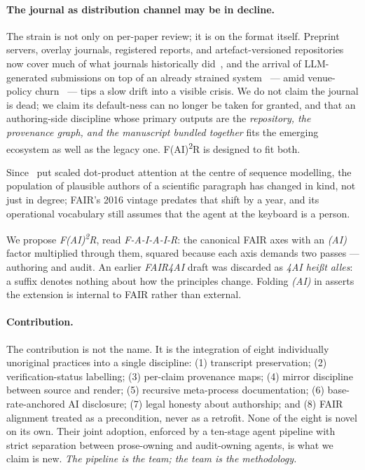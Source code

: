 \paragraph{The journal as distribution channel may be in decline.}
The strain is not only on per-paper review; it is on the format
itself. Preprint servers, overlay journals, registered reports,
and artefact-versioned repositories now cover much of what
journals historically
did~\cite{eisen2018preprints,tennant2016open},
and the arrival of LLM-generated submissions on top of an already
strained system~\cite{conroy2023sleuths} ---
amid venue-policy
churn~\cite{aclrr_llm_policy,iclr_llm_policy,neurips_llm_policy}
--- tips a slow drift into a visible crisis. We do not claim the
journal is dead; we claim its default-ness can no longer be taken
for granted, and that an authoring-side discipline whose primary
outputs are the \emph{repository, the provenance graph, and the
manuscript bundled together} fits the emerging ecosystem as well as
the legacy one. F(AI)\textsuperscript{2}R is designed to fit both.

Since~\textcite{vaswani2017attention} put scaled dot-product attention
at the centre of sequence modelling, the population of plausible
authors of a scientific paragraph has changed in kind, not just in
degree; FAIR's 2016 vintage predates that shift by a year, and its
operational vocabulary still assumes that the agent at the keyboard
is a person.

We propose \emph{F(AI)\textsuperscript{2}R}, read
\emph{F-A-I-A-I-R}: the canonical FAIR axes with an \emph{(AI)}
factor multiplied through them, squared because each axis demands
two passes --- authoring and audit. An earlier \emph{FAIR4AI}
draft was discarded as \emph{4AI heißt alles}: a suffix denotes
nothing about how the principles change. Folding \emph{(AI)} in
asserts the extension is internal to FAIR rather than external.

\paragraph{Contribution.} The contribution is not the name. It is the
integration of eight individually unoriginal practices into a single
discipline: (1) transcript preservation; (2) verification-status
labelling; (3) per-claim provenance maps; (4) mirror discipline
between source and render; (5) recursive meta-process documentation;
(6) base-rate-anchored AI disclosure; (7) legal honesty about
authorship; and (8) FAIR alignment treated as a precondition, never
as a retrofit. None of the eight is novel on its own. Their joint
adoption, enforced by a ten-stage agent pipeline with strict
separation between prose-owning and audit-owning agents, is what we
claim is new. \emph{The pipeline is the team; the team is the
methodology.}

